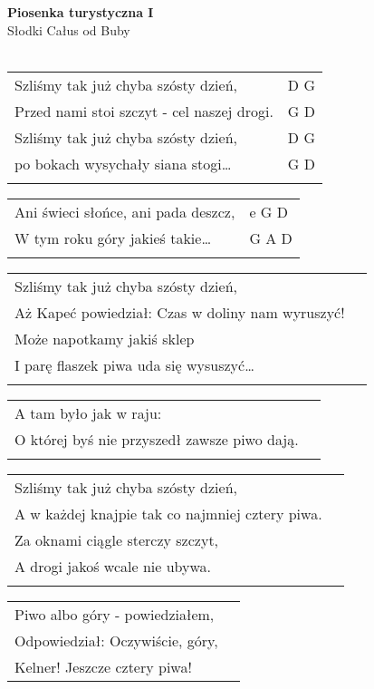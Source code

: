 \documentclass[a5paper]{article}
\begin{document}


\noindent
\fontsize{12pt}{15pt}\selectfont
\textbf{Piosenka turystyczna I} \\
\fontsize{8pt}{10pt}\selectfont
Słodki Całus od Buby \\ \\
\fontsize{10pt}{12pt}\selectfont
{}
\begin{tabular}{@{}p{9.00cm}p{3cm}@{}}
\noindent
Szliśmy tak już chyba szósty dzień,	& D G \\
Przed nami stoi szczyt - cel naszej drogi. & G D \\
Szliśmy tak już chyba szósty dzień, & D G \\                             
po bokach wysychały siana stogi… & G D \\ \\
\end{tabular}

\noindent
\begin{tabular}{@{}p{8.00cm}p{3cm}@{}}
Ani świeci słońce, ani pada deszcz, & e G D \\
W tym roku góry jakieś takie… & G A D \\ \\
\end{tabular}

\noindent
\begin{tabular}{@{}p{8.00cm}p{3cm}@{}}
Szliśmy tak już chyba szósty dzień, \\
Aż Kapeć powiedział: Czas w doliny nam wyruszyć! \\
Może napotkamy jakiś sklep \\
I parę flaszek piwa uda się wysuszyć… \\ \\
\end{tabular}

\noindent
\begin{tabular}{@{}p{8.00cm}p{3cm}@{}}
A tam było jak w raju: \\
O której byś nie przyszedł zawsze piwo dają. \\ \\
\end{tabular}

\noindent
\begin{tabular}{@{}p{8.00cm}p{3cm}@{}}
Szliśmy tak już chyba szósty dzień, \\
A w każdej knajpie tak co najmniej cztery piwa. \\
Za oknami ciągle sterczy szczyt, \\
A drogi jakoś wcale nie ubywa. \\ \\
\end{tabular}

\noindent
\begin{tabular}{@{}p{8.00cm}p{3cm}@{}}
Piwo albo góry - powiedziałem, \\
Odpowiedział: Oczywiście, góry, \\
Kelner! Jeszcze cztery piwa!
\end{tabular}
\end{document}
